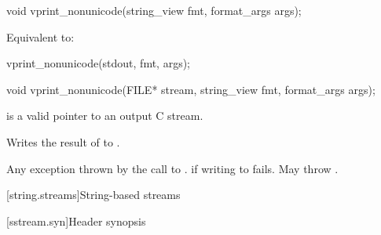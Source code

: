 %
\begin{itemdecl}
void vprint_nonunicode(string_view fmt, format_args args);
\end{itemdecl}

\begin{itemdescr}
\pnum
\effects
Equivalent to:
\begin{codeblock}
vprint_nonunicode(stdout, fmt, args);
\end{codeblock}
\end{itemdescr}

%
\begin{itemdecl}
void vprint_nonunicode(FILE* stream, string_view fmt, format_args args);
\end{itemdecl}

\begin{itemdescr}
\pnum
\expects
{} is a valid pointer to an output C stream.

\pnum
\effects
Writes the result of  to .

\pnum
\throws
Any exception thrown by the call to .
 if writing to  fails.
May throw .
\end{itemdescr}

[string.streams]{String-based streams}

[sstream.syn]{Header  synopsis}

